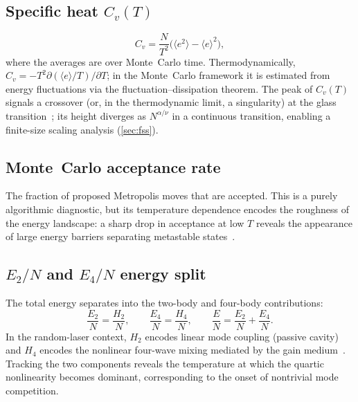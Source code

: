 \documentclass[11pt,a4paper]{article}
\newcommand{\avg}[1]{\langle #1 \rangle}
\begin{document}
\subsection{Specific heat $C_v(T)$}
\begin{equation}\label{eq:cv}
  C_v = \frac{N}{T^2}\bigl(\avg{e^2} - \avg{e}^2\bigr),
\end{equation}
where the averages are over Monte~Carlo time.
Thermodynamically, $C_v = -T^2 \partial(\avg{e}/T)/\partial T$; in
the Monte~Carlo framework it is estimated from energy fluctuations
via the fluctuation--dissipation theorem.
The peak of $C_v(T)$ signals a crossover (or, in the thermodynamic
limit, a singularity) at the glass
transition~\cite{Antenucci2015a}; its height diverges as
$N^{\alpha/\nu}$ in a continuous transition, enabling a
finite-size scaling analysis (\cref{sec:fss}).

\subsection{Monte~Carlo acceptance rate}
The fraction of proposed Metropolis moves that are accepted.
This is a purely algorithmic diagnostic, but its temperature
dependence encodes the roughness of the energy landscape: a
sharp drop in acceptance at low $T$ reveals the appearance of
large energy barriers separating metastable
states~\cite{HukushimaNemoto1996}.

\subsection{$E_2/N$ and $E_4/N$ energy split}
The total energy separates into the two-body and four-body
contributions:
\begin{equation}
  \frac{E_2}{N} = \frac{H_2}{N},\qquad
  \frac{E_4}{N} = \frac{H_4}{N},\qquad
  \frac{E}{N} = \frac{E_2}{N} + \frac{E_4}{N}.
\end{equation}
In the random-laser context, $H_2$ encodes linear mode coupling
(passive cavity) and $H_4$ encodes the nonlinear
four-wave mixing mediated by the gain
medium~\cite{Leuzzi2009,Angelani2006}.
Tracking the two components reveals the temperature at which
the quartic nonlinearity becomes dominant, corresponding to the
onset of nontrivial mode competition.

\end{document}
